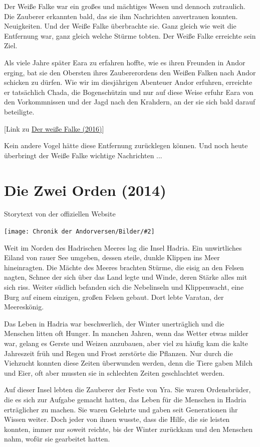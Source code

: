 \documentclass[10pt, a4paper, oneside]{book}
\newcommand{\fillbreak}{\vspace*{\fill}\columnbreak}
\newcommand{\storytext}[1]{%
    \section{#1}%
    \label{Storytext: #1}%
}
\newcommand{\refstorytext}[1]{\hyperref[Storytext: #1]{#1}}
\newcommand{\bildmitts}[2][height=0.32\textwidth,width=0.48\textwidth,keepaspectratio]{%
    \begin{center}
        \texttt{[image: Chronik der Andorversen/Bilder/\#2]}
    \end{center}
}
\begin{document}
\begin{multicols}{2}
Der Weiße Falke war ein großes und mächtiges Wesen und dennoch zutraulich. Die Zauberer erkannten bald, das sie ihm Nachrichten anvertrauen konnten. Neuigkeiten. Und der Weiße Falke überbrachte sie. Ganz gleich wie weit die Entfernung war, ganz gleich welche Stürme tobten. Der Weiße Falke erreichte sein Ziel.

Als viele Jahre später Eara zu erfahren hoffte, wie es ihren Freunden in Andor erging, bat sie den Obersten ihres Zaubererordens den Weißen Falken nach Andor schicken zu dürfen. Wie wir im diesjährigen Abenteuer Andor erfuhren, erreichte er tatsächlich Chada, die Bogenschützin und nur auf diese Weise erfuhr Eara von den Vorkommnissen und der Jagd nach den Krahdern, an der sie sich bald darauf beteiligte.

[Link zu \refstorytext{Der weiße Falke (2016)}]\bigskip

Kein andere Vogel hätte diese Entfernung zurücklegen können. Und noch heute überbringt der Weiße Falke wichtige Nachrichten ...



\fillbreak
\storytext{Die Zwei Orden (2014)}

\begin{center}
    Storytext von der offiziellen Website
\end{center}

\bildmitts{AoH Ank 1.jpeg}

Weit im Norden des Hadrischen Meeres lag die Insel Hadria. Ein unwirtliches Eiland von rauer See umgeben, dessen steile, dunkle Klippen ins Meer hineinragten. Die Mächte des Meeres brachten Stürme, die eisig an den Felsen nagten, Schnee der sich über das Land legte und Winde, deren Stärke alles mit sich riss. Weiter südlich befanden sich die Nebelinseln und Klippenwacht, eine Burg auf einem einzigen, großen Felsen gebaut. Dort lebte Varatan, der Meereskönig.\bigskip

Das Leben in Hadria war beschwerlich, der Winter unerträglich und die Menschen litten oft Hunger. In manchen Jahren, wenn das Wetter etwas milder war, gelang es Gerste und Weizen anzubauen, aber viel zu häufig kam die kalte Jahreszeit früh und Regen und Frost zerstörte die Pflanzen. Nur durch die Viehzucht konnten diese Zeiten überwunden werden, denn die Tiere gaben Milch und Eier, oft aber mussten sie in schlechten Zeiten geschlachtet werden.\bigskip

Auf dieser Insel lebten die Zauberer der Feste von Yra. Sie waren Ordensbrüder, die es sich zur Aufgabe gemacht hatten, das Leben für die Menschen in Hadria erträglicher zu machen. Sie waren Gelehrte und gaben seit Generationen ihr Wissen weiter. Doch jeder von ihnen wusste, dass die Hilfe, die sie leisten konnten, immer nur soweit reichte, bis der Winter zurückkam und den Menschen nahm, wofür sie gearbeitet hatten.\bigskip


\end{multicols}
\end{document}
